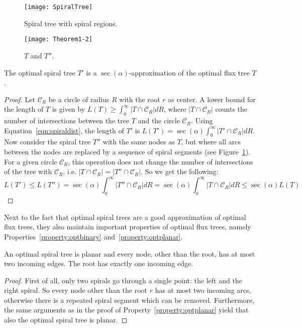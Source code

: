 \documentclass{journalA4}
\begin{document}
\begin{figure}[b]
    \hfill
    \begin{minipage}[t]{.45\textwidth}
        \centering
        \texttt{[image: SpiralTree]}
        \caption{Spiral tree with spiral regions.}
        \label{fig:SpiralTree}
    \end{minipage}
    \hfill
    \begin{minipage}[t]{.5\textwidth}
        \centering
        \texttt{[image: Theorem1-2]}
        \caption{$T$ and $T''$.}
        \label{fig:Theorem1}
    \end{minipage}
    \hfill\hfill
\end{figure}

\begin{theorem}
\label{thm:fluxapprox}
The optimal spiral tree $T'$ is a $\sec(\alpha)$-approximation of the optimal flux tree $T$.
\end{theorem}
\begin{proof}
Let $\mathcal{C}_R$ be a circle of radius $R$ with the root $r$ as center. A lower bound for the length of $T$ is given by $L(T) \geq \int_0^\infty |T \cap \mathcal{C}_R| dR$, where $|T \cap \mathcal{C}_R|$ counts the number of intersections between the tree $T$ and the circle $\mathcal{C}_R$. Using Equation~\ref{eqn:spiraldist}, the length of $T'$ is $L(T') = \sec(\alpha) \int_0^\infty |T' \cap \mathcal{C}_R| dR$. Now consider the spiral tree $T''$ with the same nodes as $T$, but where all arcs between the nodes are replaced by a sequence of spiral segments (see Figure~\ref{fig:Theorem1}). For a given circle $\mathcal{C}_R$, this operation does not change the number of intersections of the tree with $\mathcal{C}_R$, i.e. $|T \cap \mathcal{C}_R| = |T'' \cap \mathcal{C}_R|$. So we get the following:
\[
L(T') \leq L(T'') = \sec(\alpha) \int_0^\infty |T'' \cap \mathcal{C}_R| dR = \sec(\alpha) \int_0^\infty |T \cap \mathcal{C}_R| dR \leq \sec(\alpha) L(T)
\]
\end{proof}
Next to the fact that optimal spiral trees are a good approximation of optimal flux trees, they also maintain important properties of optimal flux trees, namely Properties~\ref{property:optbinary} and~\ref{property:optplanar}.

\begin{lemma}
\label{lem:spiralplandeg}
An optimal spiral tree is planar and every node, other than the root, has at most two incoming edges. The root has exactly one incoming edge.
\end{lemma}
\begin{proof}
First of all, only two spirals go through a single point: the left and the right spiral. So every node other than the root $r$ has at most two incoming arcs, otherwise there is a repeated spiral segment which can be removed. Furthermore, the same arguments as in the proof of Property~\ref{property:optplanar} yield that also the optimal spiral tree is planar.
\end{proof}
\end{document}
